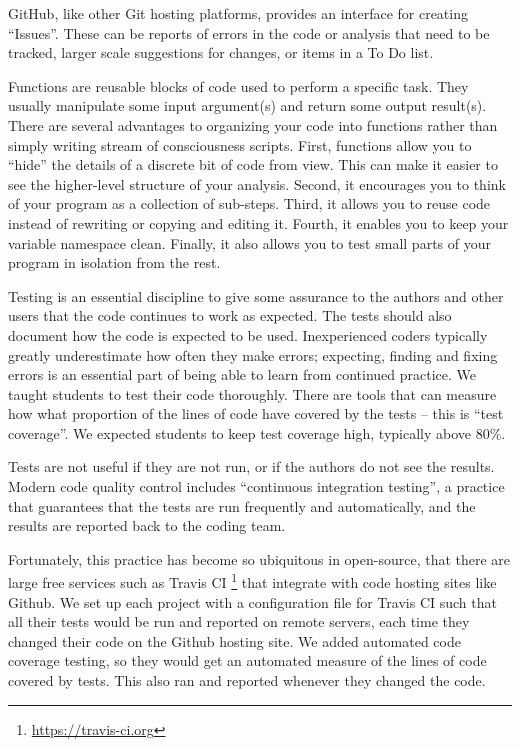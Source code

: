 GitHub, like other Git hosting platforms, provides an interface for creating
``Issues''.  These can be reports of errors in the code or analysis that need
to be tracked, larger scale suggestions for changes, or items in a To Do list.

Functions are reusable blocks of code used to perform a specific task.
They usually manipulate some input argument(s) and return some output
result(s).
There are several advantages to organizing your code into functions rather
than simply writing stream of consciousness scripts.
First, functions allow you to ``hide'' the details of a discrete bit of
code from view.
This can make it easier to see the higher-level structure of your analysis.
Second, it encourages you to think of your program as a collection of sub-steps.
Third, it allows you to reuse code instead of rewriting or copying and editing
it.
Fourth, it enables you to keep your variable namespace clean.
Finally, it also allows you to test small parts of your program in isolation
from the rest.

Testing is an essential discipline to give some assurance to the authors and
other users that the code
continues to work as expected. The tests should also document how the code is
expected to be used.
Inexperienced coders typically greatly underestimate how often they make
errors; expecting, finding and fixing errors is an essential part of being
able to learn from continued practice.  We taught students to test their code
thoroughly.  There are tools that can measure how what proportion of the lines
of code have covered by the tests -- this is ``test coverage''. We expected
students to keep test coverage high, typically above 80\%.



Tests are not useful if they are not run, or if the authors do not see the
results.  Modern code quality control includes ``continuous integration
testing'', a practice that guarantees that the tests are run frequently and
automatically, and the results are reported back to the coding team.

Fortunately, this practice has become so ubiquitous in open-source, that there
are large free services such as Travis CI
\footnote{\url{https://travis-ci.org}} that integrate with code hosting sites
like Github. We set up each project with a configuration file for Travis CI
such that all their tests would be run and reported on remote servers, each
time they changed their code on the Github hosting site.  We added automated
code coverage testing, so they would get an automated measure of the lines of
code covered by tests. This also ran and reported whenever they changed the
code.

